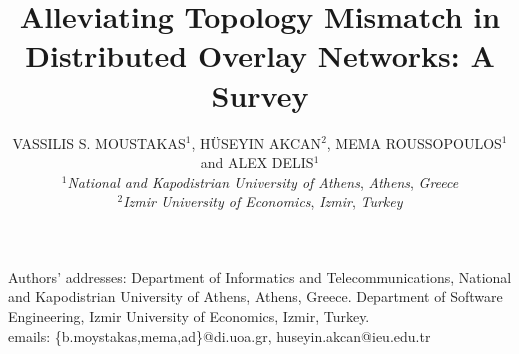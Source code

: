 \documentclass[acmcsur,acmnow]{acmtrans2m}
\title{Alleviating Topology Mismatch in Distributed Overlay Networks: A Survey}
\author{
VASSILIS S. MOUSTAKAS$^1$, H\"USEYIN AKCAN$^2$, MEMA ROUSSOPOULOS$^1$ and ALEX
DELIS$^1$\\
$^1$\emph{National and Kapodistrian University of Athens}, \emph{Athens},
\emph{Greece}\\
$^2$\emph{Izmir University of Economics}, \emph{Izmir}, \emph{Turkey}
}
\begin{document}
\begin{bottomstuff}
Authors' addresses: Department of Informatics and Telecommunications, National
and Kapodistrian University of Athens, Athens, Greece. Department of Software
Engineering, Izmir University of Economics, Izmir, Turkey.\\
emails: \{b.moystakas,mema,ad\}@di.uoa.gr, huseyin.akcan@ieu.edu.tr
\end{bottomstuff}

\maketitle




%
%
%
%
%





%
%
\end{document}

